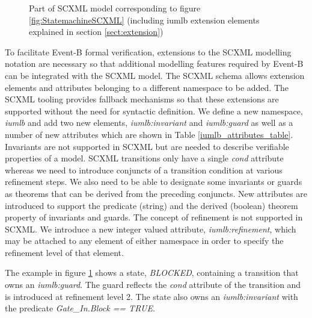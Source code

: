 \begin{figure}[tbp!]
  \caption{Part of SCXML model corresponding to figure \ref{fig:StatemachineSCXML} 
   (including iumlb extension elements explained in section \ref{sect:extension}) } 
  \label{fig:scxml}
\end{figure}

To facilitate Event-B formal verification, extensions to the SCXML 
modelling notation are necessary so that additional modelling features 
required by Event-B can be integrated with the SCXML model.
The SCXML schema allows extension elements and attributes belonging 
to a different namespace to be added. 
The SCXML tooling provides fallback mechanisms so that these extensions are supported 
without the need for syntactic definition. We define a new namespace,  
\emph{iumlb} and add two new elements, \emph{iumlb:invariant} and 
\emph{iumlb:guard} as well as a 
number of new attributes which are shown in Table \ref{iumlb_attributes_table}.
Invariants are not supported in SCXML but are needed to describe 
verifiable properties of a model. 
SCXML transitions only have a single \emph{cond} attribute whereas we need to introduce conjuncts of a transition
condition at various refinement steps. 
We also need to be able to designate some 
invariants or guards as theorems that can be derived from the preceding conjuncts. 
New attributes are introduced to support the predicate (string) and the 
derived (boolean) theorem property of invariants and guards. The concept 
of refinement is not supported in SCXML. We introduce a new integer valued 
attribute, \emph{iumlb:refinement}, which may be attached to any element of 
either namespace in order to specify the refinement level of that element. 


The example in figure \ref{fig:scxml} shows a state, \emph{BLOCKED}, 
containing a transition that owns an \emph{iumlb:guard}.
The guard reflects the \emph{cond} attribute of the transition 
and is introduced at refinement level 2. 
The state also owns an \emph{iumlb:invariant} with the predicate
 \emph{Gate\_In.Block == TRUE}.





